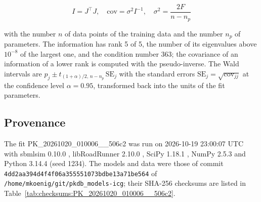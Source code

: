 \documentclass{article}
\begin{document}
\begin{equation}
I = J^\top J, \quad \mathrm{cov} = \sigma^2 I^{-1}, \quad \sigma^2 = \frac{2 F}{n - n_p}
\end{equation}

with the number $n$ of data points of the training data and the number $n_p$ of parameters. The information has rank 5 of 5, the number of its eigenvalues above $10^{-8}$ of the largest one, and the condition number 363; the covariance of an information of a lower rank is computed with the pseudo-inverse. The Wald intervals are $\hat{p}_j \pm t_{(1+\alpha)/2,\, n-n_p}\, \mathrm{SE}_j$ with the standard errors $\mathrm{SE}_j = \sqrt{\mathrm{cov}_{jj}}$ at the confidence level $\alpha = 0.95$, transformed back into the units of the fit parameters.

\subsection{Provenance}

The fit PK\_20261020\_010006\_\_506c2 was run on 2026-10-19 23:00:07 UTC with sbmlsim 0.10.0 \cite{Koenig2026_sbmlsim}, libRoadRunner 2.10.0 \cite{Welsh2023}, SciPy 1.18.1 \cite{Virtanen2020}, NumPy 2.5.3 \cite{Harris2020} and Python 3.14.4 (seed 1234). The models and data were those of commit \texttt{4dd2aa394d4f4f06a355551073bdbe13a71be564} of \texttt{/home/mkoenig/git/pkdb\_models-icg}; their SHA-256 checksums are listed in Table~\ref{tab:checksums:PK_20261020_010006__506c2}.
\end{document}
